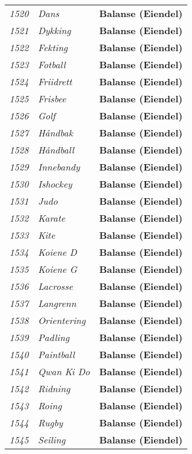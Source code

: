 \begin{longtable}{l l l}
\emph{1520} & \emph{Dans} & {\bfseries Balanse (Eiendel)}\\
\emph{1521} & \emph{Dykking} & {\bfseries Balanse (Eiendel)}\\
\emph{1522} & \emph{Fekting} & {\bfseries Balanse (Eiendel)}\\
\emph{1523} & \emph{Fotball} & {\bfseries Balanse (Eiendel)}\\
\emph{1524} & \emph{Friidrett} & {\bfseries Balanse (Eiendel)}\\
\emph{1525} & \emph{Frisbee} & {\bfseries Balanse (Eiendel)}\\
\emph{1526} & \emph{Golf} & {\bfseries Balanse (Eiendel)}\\
\emph{1527} & \emph{Håndbak} & {\bfseries Balanse (Eiendel)}\\
\emph{1528} & \emph{Håndball} & {\bfseries Balanse (Eiendel)}\\
\emph{1529} & \emph{Innebandy} & {\bfseries Balanse (Eiendel)}\\
\emph{1530} & \emph{Ishockey} & {\bfseries Balanse (Eiendel)}\\
\emph{1531} & \emph{Judo} & {\bfseries Balanse (Eiendel)}\\
\emph{1532} & \emph{Karate} & {\bfseries Balanse (Eiendel)}\\
\emph{1533} & \emph{Kite} & {\bfseries Balanse (Eiendel)}\\
\emph{1534} & \emph{Koiene D} & {\bfseries Balanse (Eiendel)}\\
\emph{1535} & \emph{Koiene G} & {\bfseries Balanse (Eiendel)}\\
\emph{1536} & \emph{Lacrosse} & {\bfseries Balanse (Eiendel)}\\
\emph{1537} & \emph{Langrenn} & {\bfseries Balanse (Eiendel)}\\
\emph{1538} & \emph{Orientering} & {\bfseries Balanse (Eiendel)}\\
\emph{1539} & \emph{Padling} & {\bfseries Balanse (Eiendel)}\\
\emph{1540} & \emph{Paintball} & {\bfseries Balanse (Eiendel)}\\
\emph{1541} & \emph{Qwan Ki Do} & {\bfseries Balanse (Eiendel)}\\
\emph{1542} & \emph{Ridning} & {\bfseries Balanse (Eiendel)}\\
\emph{1543} & \emph{Roing} & {\bfseries Balanse (Eiendel)}\\
\emph{1544} & \emph{Rugby} & {\bfseries Balanse (Eiendel)}\\
\emph{1545} & \emph{Seiling} & {\bfseries Balanse (Eiendel)}\\

\end{longtable}
